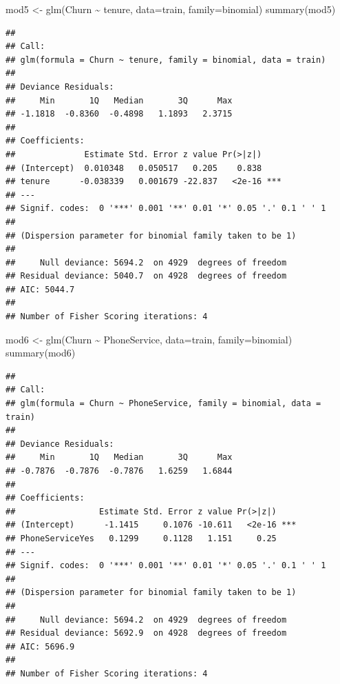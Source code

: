 \documentclass[
  twoside]{article}
\newenvironment{Shaded}{\begin{snugshade}}{\end{snugshade}}
\newcommand{\AttributeTok}[1]{\textcolor[rgb]{0.77,0.63,0.00}{#1}}
\newcommand{\FunctionTok}[1]{\textcolor[rgb]{0.00,0.00,0.00}{#1}}
\newcommand{\NormalTok}[1]{#1}
\newcommand{\OtherTok}[1]{\textcolor[rgb]{0.56,0.35,0.01}{#1}}
\newcommand{\SpecialCharTok}[1]{\textcolor[rgb]{0.00,0.00,0.00}{#1}}
\begin{document}
\begin{Shaded}
\begin{Highlighting}[]
\NormalTok{mod5 }\OtherTok{\textless{}{-}} \FunctionTok{glm}\NormalTok{(Churn }\SpecialCharTok{\textasciitilde{}}\NormalTok{ tenure, }\AttributeTok{data=}\NormalTok{train, }\AttributeTok{family=}\NormalTok{binomial)}
\FunctionTok{summary}\NormalTok{(mod5)}
\end{Highlighting}
\end{Shaded}

\begin{verbatim}
## 
## Call:
## glm(formula = Churn ~ tenure, family = binomial, data = train)
## 
## Deviance Residuals: 
##     Min       1Q   Median       3Q      Max  
## -1.1818  -0.8360  -0.4898   1.1893   2.3715  
## 
## Coefficients:
##              Estimate Std. Error z value Pr(>|z|)    
## (Intercept)  0.010348   0.050517   0.205    0.838    
## tenure      -0.038339   0.001679 -22.837   <2e-16 ***
## ---
## Signif. codes:  0 '***' 0.001 '**' 0.01 '*' 0.05 '.' 0.1 ' ' 1
## 
## (Dispersion parameter for binomial family taken to be 1)
## 
##     Null deviance: 5694.2  on 4929  degrees of freedom
## Residual deviance: 5040.7  on 4928  degrees of freedom
## AIC: 5044.7
## 
## Number of Fisher Scoring iterations: 4
\end{verbatim}

\begin{Shaded}
\begin{Highlighting}[]
\NormalTok{mod6 }\OtherTok{\textless{}{-}} \FunctionTok{glm}\NormalTok{(Churn }\SpecialCharTok{\textasciitilde{}}\NormalTok{ PhoneService, }\AttributeTok{data=}\NormalTok{train, }\AttributeTok{family=}\NormalTok{binomial)}
\FunctionTok{summary}\NormalTok{(mod6)}
\end{Highlighting}
\end{Shaded}

\begin{verbatim}
## 
## Call:
## glm(formula = Churn ~ PhoneService, family = binomial, data = train)
## 
## Deviance Residuals: 
##     Min       1Q   Median       3Q      Max  
## -0.7876  -0.7876  -0.7876   1.6259   1.6844  
## 
## Coefficients:
##                 Estimate Std. Error z value Pr(>|z|)    
## (Intercept)      -1.1415     0.1076 -10.611   <2e-16 ***
## PhoneServiceYes   0.1299     0.1128   1.151     0.25    
## ---
## Signif. codes:  0 '***' 0.001 '**' 0.01 '*' 0.05 '.' 0.1 ' ' 1
## 
## (Dispersion parameter for binomial family taken to be 1)
## 
##     Null deviance: 5694.2  on 4929  degrees of freedom
## Residual deviance: 5692.9  on 4928  degrees of freedom
## AIC: 5696.9
## 
## Number of Fisher Scoring iterations: 4
\end{verbatim}
\end{document}
